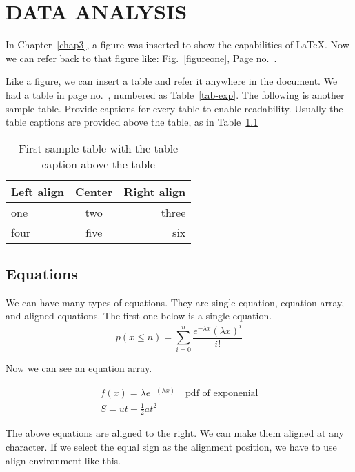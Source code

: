 \chapter{DATA ANALYSIS}\label{chap4}
\thispagestyle{empty}

In Chapter~\ref{chap3}, a figure was inserted to show the capabilities of \LaTeX. Now we can refer back to that figure like: Fig.~\ref{figureone}, Page no.~\pageref{figureone}.


Like a figure, we can insert a table and refer it anywhere in the document. We had a table in page no.~\pageref{tab-exp}, numbered as Table~\ref{tab-exp}. The following is another sample table. Provide captions for every table to enable readability. Usually the table captions are provided above the table, as in Table~\ref{tableone}

\begin{table}[h]\centering \caption[First table]{First sample table with the table caption above the table}\label{tableone}
\begin{tabular}{|l|c|r|}
\hline Left align & Center & Right align\\
\hline one  & two &  three\\\hline 
four & five  & six \\
\hline 
\end{tabular}
\end{table}

\section{Equations}

We can have many types of equations. They are single equation, equation array, and aligned equations. The first one below is a single equation.
\begin{equation}
p(x\leq n)=\sum_{i=0}^{n} \frac{e^{-\lambda x} {(\lambda x)}^i}{i !}\label{poiss}
\end{equation}

Now we can see an equation array.

\begin{eqnarray}
f(x)=\lambda e^{-(\lambda x)} \quad \text{pdf of exponenial}\label{exp}\\
S=ut+\frac{1}{2}at^2\label{dist}
\end{eqnarray}

The above equations are aligned to the right. We can make them aligned at any character. If we select the equal sign as the alignment position, we have to use align environment like this.

